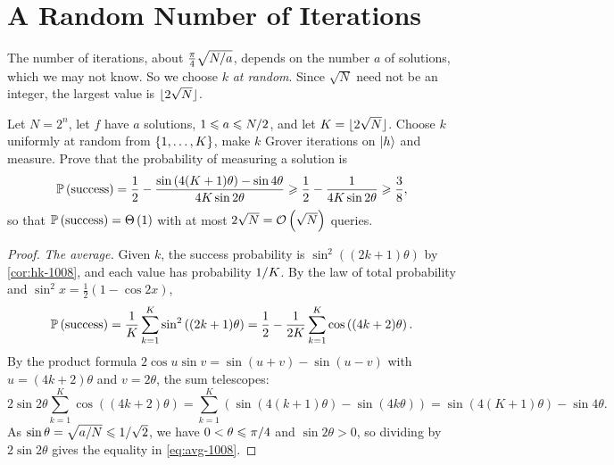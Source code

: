 \section{A Random Number of Iterations}\label{sec:randomk-1008}

The number of iterations, about $\frac{\pi}{4}\sqrt{N/a}$, depends on the number $a$ of
solutions, which we may not know. So we choose $k$ \emph{at random}. Since $\sqrt{N}$ need not be an
integer, the largest value is $\floor{2\sqrt{N}}$.

\begin{exercisebox}
\begin{exercise}\label{ex:randomk-1008}\label{thm:randomk-1008}
    Let $N = 2^n$, let $f$ have $a$ solutions, $1 \leqslant a \leqslant N/2$, and let
    $K = \floor{2\sqrt{N}}$. Choose $k$ uniformly at random from $\left\lbrace1, \dots, K\right\rbrace$, make $k$ Grover
    iterations on $\lvert h \rangle$ and measure. Prove that the probability of measuring a solution is
    \begin{equation}\label{eq:avg-1008}
        \prob{\text{success}} = \frac{1}{2} - \frac{\sin\left(4(K+1)\theta\right) - \sin 4\theta}{4K\sin 2\theta}
        \geq \frac{1}{2} - \frac{1}{4K\sin 2\theta} \geq \frac{3}{8},
    \end{equation}
    so that $\prob{\text{success}} = \bigTh{1}$ with at most $2\sqrt{N} = \mathcal{O}\left(\sqrt{N}\right)$ queries.
\end{exercise}
\tcblower
\begin{proof}
    \emph{The average.} Given $k$, the success probability is $\sin^2((2k+1)\theta)$ by
    \cref{cor:hk-1008}, and each value has probability $1/K$. By the law of total probability
    and $\sin^2 x = \frac{1}{2}(1 - \cos 2x)$,
    \[\prob{\text{success}} = \frac{1}{K}\sum_{k=1}^{K} \sin^2\left((2k+1)\theta\right)
        = \frac{1}{2} - \frac{1}{2K}\sum_{k=1}^{K} \cos\left((4k+2)\theta\right).\]
    By the product formula $2\cos u \sin v = \sin(u+v) - \sin(u-v)$ with $u = (4k+2)\theta$ and
    $v = 2\theta$, the sum telescopes:
    \[2\sin 2\theta \sum_{k=1}^{K} \cos\left((4k+2)\theta\right)
        = \sum_{k=1}^{K} \left(\sin\left(4(k+1)\theta\right) - \sin\left(4k\theta\right)\right)
        = \sin\left(4(K+1)\theta\right) - \sin 4\theta.\]
    As $\sin\theta = \sqrt{a/N} \leqslant 1/\sqrt{2}$, we have $0 < \theta \leqslant \pi/4$
    and $\sin 2\theta > 0$, so dividing by $2\sin 2\theta$ gives the equality in \cref{eq:avg-1008}.


\end{proof}
\end{exercisebox}
